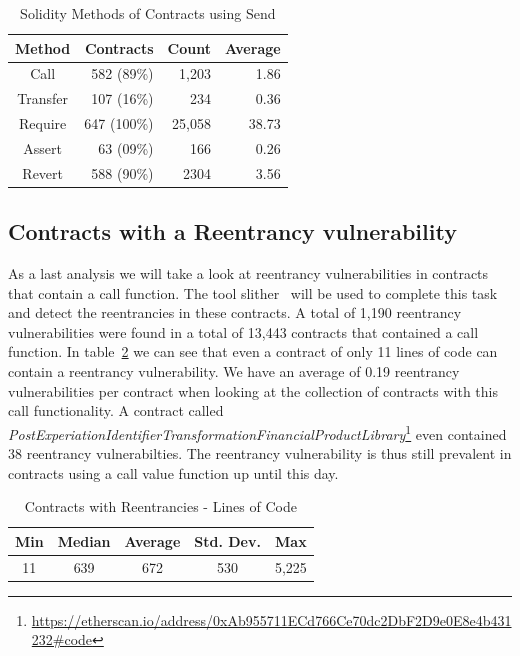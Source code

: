 \documentclass[10pt,conference]{IEEEtran}
\begin{document}
\begin{table}
\center
  \caption{Solidity Methods of Contracts using Send}
  \label{tab:send}
  \begin{tabular}{crrr}
    \hline
    Method & Contracts & Count & Average \\
    \hline
    Call& 582 (89\%) & 1,203 & 1.86\\
    Transfer& 107 (16\%) & 234 & 0.36\\
    Require& 647 (100\%) & 25,058 & 38.73\\
    Assert& 63 (09\%) & 166 & 0.26\\
    Revert& 588 (90\%) & 2304 & 3.56\\
    \hline
\end{tabular}
\end{table}

\subsection{Contracts with a Reentrancy vulnerability}
As a last analysis we will take a look at reentrancy vulnerabilities in contracts that contain a call function. The tool slither~\cite{slither} will be used to complete this task and detect the reentrancies in these contracts.
A total of 1,190 reentrancy vulnerabilities were found in a total of 13,443 contracts that contained a call function. In table~\ref{tab:re-loc} we can see that even a contract of only 11 lines of code can contain a reentrancy vulnerability. We have an average of 0.19 reentrancy vulnerabilities per contract when looking at the collection of contracts with this call functionality. A contract called 
 \textit{PostExperiationIdentifierTransformationFinancialProductLibrary}\footnote{\url{https://etherscan.io/address/0xAb955711ECd766Ce70dc2DbF2D9e0E8e4b431232\#code}} even contained 38 reentrancy vulnerabilties. The reentrancy vulnerability is thus still prevalent in contracts using a call value function up until this day. 

\begin{table}
\center
  \caption{Contracts with Reentrancies - Lines of Code}
  \label{tab:re-loc}
  \begin{tabular}{c c c c c}
    \hline
    Min & Median & Average & Std. Dev. & Max \\
    \hline
   11 & 639 & 672 & 530 & 5,225 \\
  \hline
\end{tabular}
\end{table}
\end{document}
